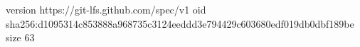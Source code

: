 version https://git-lfs.github.com/spec/v1
oid sha256:d1095314c853888a968735c3124eeddd3e794429c603680edf019db0dbf189be
size 63
